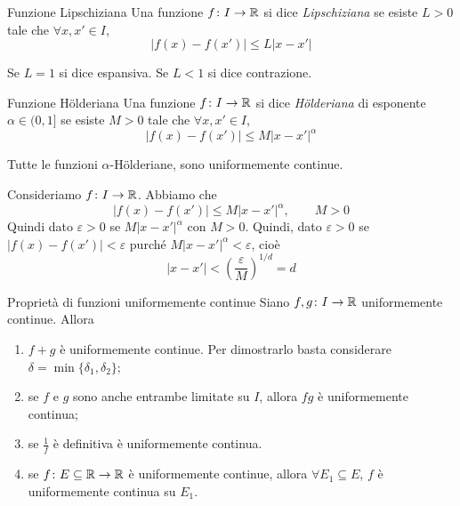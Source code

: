 \documentclass[a4paper]{article}
\begin{document}
\begin{snippetdefinition}{Funzione Lipschiziana}
    Una funzione \(f\colon I \to \mathbb{R}\) si dice \emph{Lipschiziana}
    se esiste \(L>0\) tale che \(\forall x,x' \in I\), 
    \[
        |f(x) - f(x')| \leq L|x-x'|
    \]
\end{snippetdefinition}

Se \(L = 1\) si dice espansiva. Se \(L < 1\) si dice contrazione.

\begin{snippetdefinition}{Funzione Hölderiana}
    Una funzione \(f\colon I \to \mathbb{R}\) si dice \emph{Hölderiana}
    di esponente \(\alpha \in (0,1]\) se esiste \(M>0\)
    tale che \(\forall x,x' \in I\),
    \[
        |f(x) - f(x')| \leq M{|x-x'|}^\alpha
    \]
\end{snippetdefinition}

\begin{snippetproposition}{}
    Tutte le funzioni \(\alpha\)-Hölderiane, sono uniformemente continue.
\end{snippetproposition}

\begin{snippetproof}{}
    Consideriamo \(f\colon I \to \mathbb{R}\). Abbiamo che
    \[
        |f(x) - f(x')| \leq M{|x-x'|}^\alpha, \qquad M>0
    \]
    Quindi dato \(\varepsilon > 0\) se \(M{|x-x'|}^\alpha\) con \(M>0\).
    Quindi, dato \(\varepsilon > 0\) se \(|f(x) - f(x')| < \varepsilon\) purché
    \(M{|x-x'|}^\alpha < \varepsilon\), cioè
    \[
        |x-x'| < {\left(\frac{\varepsilon}{M}\right)}^{1/d} = d
    \]
\end{snippetproof}

\begin{snippetproposition}{Proprietà di funzioni uniformemente continue}
    Siano \(f,g\colon I \to \mathbb{R}\) uniformemente continue. Allora
    \begin{enumerate}
        \item \(f+g\) è uniformemente continue. Per dimostrarlo basta considerare \(\delta = \min\{\delta_1, \delta_2\}\);
        \item se \(f\) e \(g\) sono anche entrambe limitate su \(I\), allora \(fg\) è uniformemente continua;
        \item se \(\frac{1}{f}\) è definitiva è uniformemente continua.
        \item se \(f\colon E\subseteq \mathbb{R} \to \mathbb{R}\) è uniformemente continue, allora
            \(\forall E_1 \subseteq E\), \(f\) è uniformemente continua su \(E_1\).
    \end{enumerate}
\end{snippetproposition}
\end{document}
